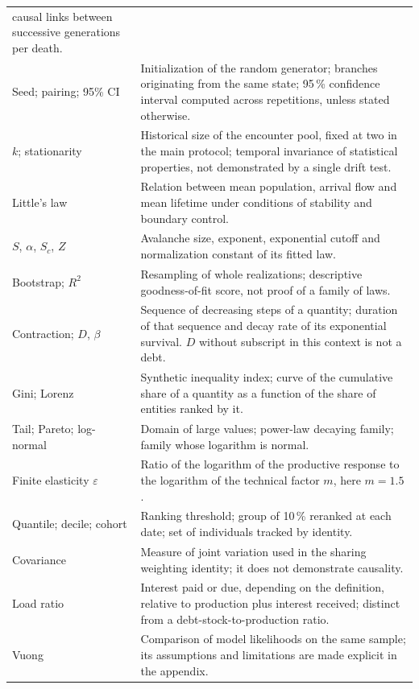 \begin{small}
\begin{longtable}{@{}>{\raggedright\arraybackslash}p{.27\linewidth}p{.66\linewidth}@{}}
causal links between successive generations per death. \\
Seed; pairing; 95\% CI & Initialization of the random generator;
branches originating from the same state; 95\,\% confidence interval
computed across repetitions, unless stated otherwise. \\
$k$; stationarity & Historical size of the encounter pool, fixed at
two in the main protocol; temporal invariance of statistical
properties, not demonstrated by a single drift test. \\
Little's law & Relation between mean population, arrival flow and
mean lifetime under conditions of stability and boundary control. \\
$S$, $\alpha$, $S_c$, $Z$ & Avalanche size, exponent, exponential
cutoff and normalization constant of its fitted law. \\
Bootstrap; $R^2$ & Resampling of whole realizations; descriptive
goodness-of-fit score, not proof of a family of laws. \\
Contraction; $D$, $\beta$ & Sequence of decreasing steps of a
quantity; duration of that sequence and decay rate of its
exponential survival. $D$ without subscript in this context is not
a debt. \\
Gini; Lorenz & Synthetic inequality index; curve of the cumulative
share of a quantity as a function of the share of entities ranked
by it. \\
Tail; Pareto; log-normal & Domain of large values; power-law
decaying family; family whose logarithm is normal. \\
Finite elasticity $\varepsilon$ & Ratio of the logarithm of the
productive response to the logarithm of the technical factor $m$,
here $m=1.5$. \\
Quantile; decile; cohort & Ranking threshold; group of 10\,\%
reranked at each date; set of individuals tracked by identity. \\
Covariance & Measure of joint variation used in the sharing weighting
identity; it does not demonstrate causality. \\
Load ratio & Interest paid or due, depending on the definition,
relative to production plus interest received; distinct from a
debt-stock-to-production ratio. \\
Vuong & Comparison of model likelihoods on the same sample; its
assumptions and limitations are made explicit in the appendix. \\
\bottomrule
\end{longtable}
\end{small}
